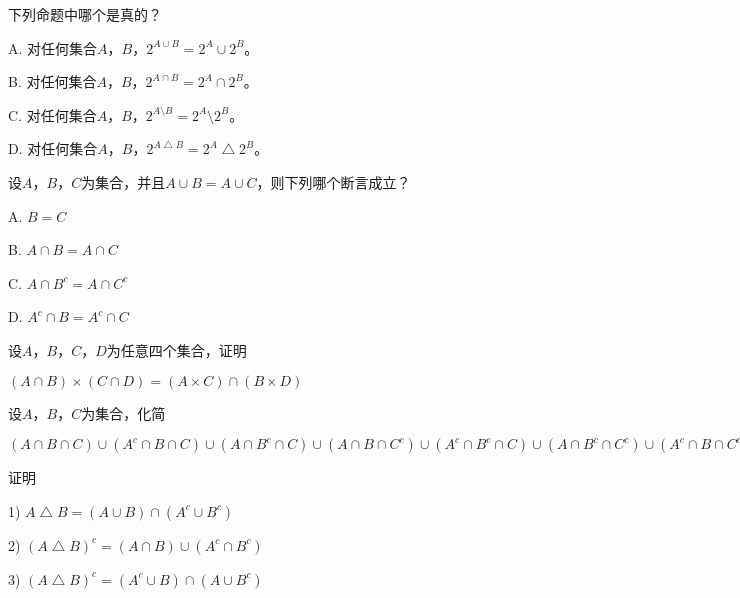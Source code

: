   \begin{Exercise}
下列命题中哪个是真的？

A. 对任何集合$A$，$B$，$2^{A\cup B} = 2^A \cup 2^B$。

B. 对任何集合$A$，$B$，$2^{A\cap B} = 2^A \cap 2^B$。

C. 对任何集合$A$，$B$，$2^{A\setminus B} = 2^A \setminus 2^B$。

D. 对任何集合$A$，$B$，$2^{A\bigtriangleup B} = 2^A \bigtriangleup 2^B$。
  \end{Exercise}
  \begin{Exercise}
    设$A$，$B$，$C$为集合，并且$A\cup B = A \cup C$，则下列哪个断言成立？

    A. $B = C$

    B. $A \cap B = A \cap C$

    C. $A \cap B^c = A \cap C^c$

    D. $A^c \cap B = A^c \cap C$
  \end{Exercise}
  \begin{Exercise}
    设$A$，$B$，$C$，$D$为任意四个集合，证明

    $(A \cap B) \times (C \cap D) =
    (A\times C) \cap (B \times D)$
  \end{Exercise}
  \begin{Exercise}
   设$A$，$B$，$C$为集合，化简

$(A \cap B \cap C)\cup (A^c \cap B \cap C) \cup (A \cap B^c \cap C) \cup (A \cap B \cap C^c) \cup (A^c \cap B^c \cap C) \cup (A \cap B^c \cap C^c) \cup (A^c \cap B \cap C^c)$
  \end{Exercise}
  \begin{Exercise}
   证明

1) $A\bigtriangleup B = (A\cup B) \cap (A^c \cup B^c)$

2) $(A \bigtriangleup B)^c = (A \cap B) \cup (A^c \cap B^c)$

3) $(A \bigtriangleup B)^c = (A^c \cup B) \cap (A \cup B^c)$
\end{Exercise}
\clearpage
\newtheorem*{Exercise1.4}{练习1.4}

